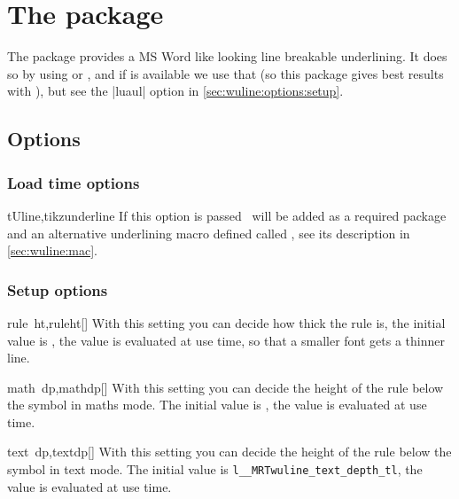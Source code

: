 \chapter{The  package}
The package provides a MS Word like looking line breakable underlining. It does
so by using  or , and if  is available we
use that (so this package gives best results with ), but see
the |luaul| option in \autoref{sec:wuline:options:setup}.

\section{Options}
\subsection{Load time options}\label{sec:wuline:options:loadtime}%
\begin{describeopt}{tUline,tikzunderline}
  If this option is passed \TikZ\ will be added as a required package and an
  alternative underlining macro defined called , see its description
  in \autoref{sec:wuline:mac}.
\end{describeopt}

\subsection{Setup options}\label{sec:wuline:options:setup}%
\begin{describeopt}{rule~ht,ruleht}[]
  With this setting you can decide how thick the rule is, the initial value is
  \texttt{}, the value is evaluated at use
  time, so that a smaller font gets a thinner line.
\end{describeopt}

\begin{describeopt}{math~dp,mathdp}[]
  With this setting you can decide the height of the rule below the symbol in
  maths mode. The initial value is
  \texttt{}, the value is evaluated at use
  time.
\end{describeopt}

\begin{describeopt}{text~dp,textdp}[]
  With this setting you can decide the height of the rule below the symbol in
  text mode. The initial value is
  \texttt{\csname l__MRTwuline_text_depth_tl\endcsname}, the value is evaluated
  at use time.
\end{describeopt}

